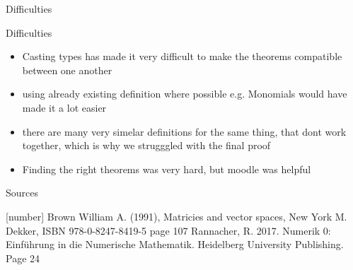 \documentclass[8pt]{beamer}
\begin{document}
		\begin{frame}{Difficulties}
			\begin{block}{Difficulties}
				\begin{itemize}
					\item Casting types has made it very difficult to make the theorems compatible between one another
					\item using already existing definition where possible e.g. Monomials would have made it a lot easier
					\item there are many very simelar definitions for the same thing, that dont work together, which is why we strugggled with the final proof
					\item Finding the right theorems was very hard, but moodle was helpful 
				\end{itemize}
			\end{block}
		\end{frame}
		\begin{frame}{Sources}
			\begin{thebibliography}{9}
				[number]
				Brown William A. (1991), Matricies and vector spaces, New York M. Dekker, ISBN 978-0-8247-8419-5 page 107
				Rannacher, R. 2017. Numerik 0: Einführung in die Numerische Mathematik. Heidelberg University Publishing. Page 24
			\end{thebibliography}
		\end{frame}
													
\end{document}

